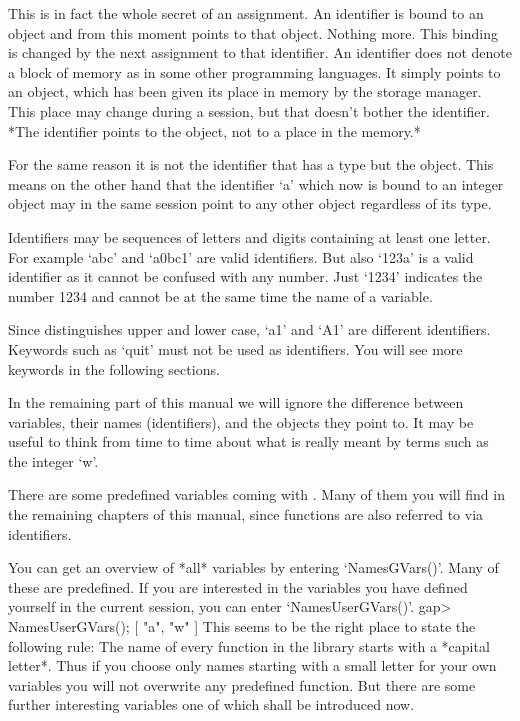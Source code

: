 This is in fact the whole secret of an assignment. An identifier is bound
to an  object and from this moment  points to that object.  Nothing more.
This binding  is changed by the  next  assignment to that  identifier. An
identifier does not denote a block of memory as in some other programming
languages. It simply points to an object, which has  been given its place
in memory by the {\GAP} storage manager.   This place may change during a
{\GAP} session, but that doesn't  bother the identifier.  *The identifier
points to the object, not to a place in the memory.*

For the  same reason it is  not the  identifier that has   a type but the
object.  This means  on the other hand that  the identifier `a' which now
is bound to an integer object may in the  same session point to any other
object regardless of its type.

Identifiers  may be sequences  of letters and digits containing at  least
one letter.   For example  `abc' and `a0bc1'  are valid identifiers.  But
also `123a'  is  a valid identifier as  it cannot be  confused  with  any
number.  Just `1234' indicates the  number 1234 and cannot be at the same
time the name of a variable.

Since  {\GAP} distinguishes  upper and  lower  case, `a1'  and  `A1'  are
different  identifiers.   Keywords  such as `quit'  must not  be used  as
identifiers.  You will see more keywords in the following sections.

In  the remaining  part of  this manual   we  will ignore the  difference
between variables, their names  (identifiers), and the objects they point
to.  It may be useful  to think from time  to  time about what is  really
meant by terms such as the integer `w'.

There are some predefined variables coming with {\GAP}.  Many of them you
will find in the remaining  chapters of  this manual, since functions are
also referred to via identifiers.

You    can get   an  overview   of  *all*  {\GAP}   variables by entering
`NamesGVars()'.  Many of these are predefined.  If  you are interested in
the variables you  have defined yourself  in the current {\GAP}  session,
you can enter `NamesUserGVars()'.
\begintt
    gap> NamesUserGVars();
    [ "a", "w" ]
\endtt
This seems to be the  right place to state the  following rule:  The name
of  every function in the {\GAP}  library starts with a *capital letter*.
Thus if you choose  only names starting with a  small letter for your own
variables you will  not overwrite any predefined  function. But there are
some further interesting variables one of which shall be introduced now.

